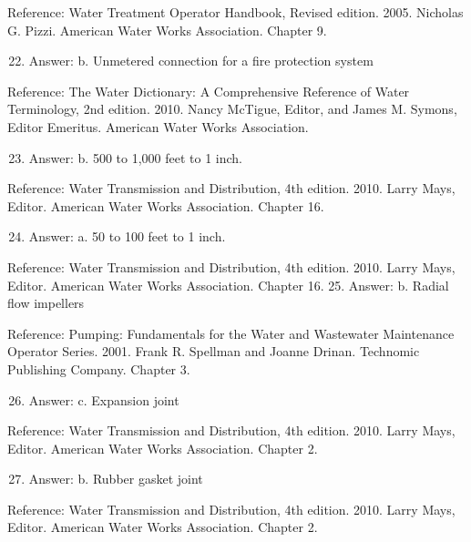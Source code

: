 \documentclass[10pt]{article}
\begin{document}
Reference: Water Treatment Operator Handbook, Revised edition. 2005. Nicholas G. Pizzi. American Water Works Association. Chapter 9.

\begin{enumerate}
  \setcounter{enumi}{21}
  \item Answer: b. Unmetered connection for a fire protection system
\end{enumerate}

Reference: The Water Dictionary: A Comprehensive Reference of Water Terminology, 2nd edition. 2010. Nancy McTigue, Editor, and James M. Symons, Editor Emeritus. American Water Works Association.

\begin{enumerate}
  \setcounter{enumi}{22}
  \item Answer: b. 500 to 1,000 feet to 1 inch.
\end{enumerate}

Reference: Water Transmission and Distribution, 4th edition. 2010. Larry Mays, Editor. American Water Works Association. Chapter 16.

\begin{enumerate}
  \setcounter{enumi}{23}
  \item Answer: a. 50 to 100 feet to 1 inch.
\end{enumerate}

Reference: Water Transmission and Distribution, 4th edition. 2010. Larry Mays, Editor. American Water Works Association. Chapter 16. 25. Answer: b. Radial flow impellers

Reference: Pumping: Fundamentals for the Water and Wastewater Maintenance Operator Series. 2001. Frank R. Spellman and Joanne Drinan. Technomic Publishing Company. Chapter 3.

\begin{enumerate}
  \setcounter{enumi}{25}
  \item Answer: c. Expansion joint
\end{enumerate}

Reference: Water Transmission and Distribution, 4th edition. 2010. Larry Mays, Editor. American Water Works Association. Chapter 2.

\begin{enumerate}
  \setcounter{enumi}{26}
  \item Answer: b. Rubber gasket joint
\end{enumerate}

Reference: Water Transmission and Distribution, 4th edition. 2010. Larry Mays, Editor. American Water Works Association. Chapter 2.
\end{document}
